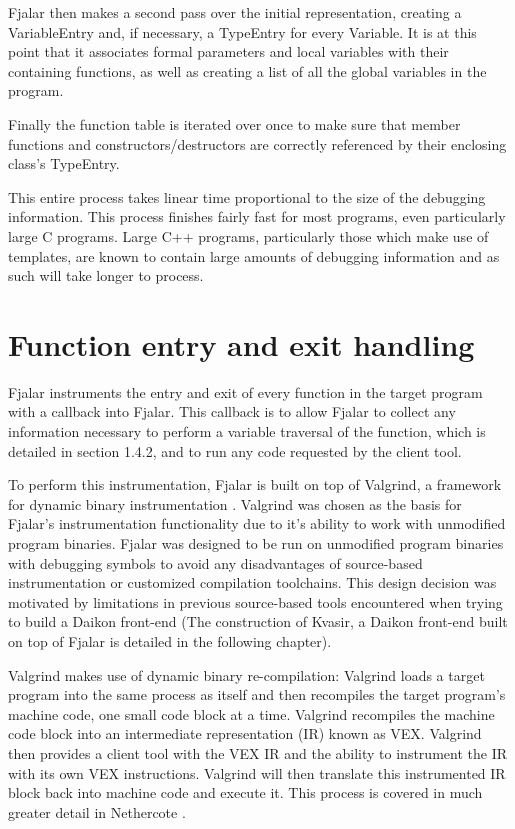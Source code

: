 \documentclass[11pt]{article}
\begin{document}
Fjalar then makes a second pass over the initial representation,
creating a VariableEntry and, if necessary, a TypeEntry for every
Variable. It is at this point that it associates formal parameters and
local variables with their containing functions, as well as creating a
list of all the global variables in the program.

Finally the function table is iterated over once to make sure that
member functions and constructors/destructors are correctly referenced
by their enclosing class's TypeEntry.

This entire process takes linear time proportional to the size of the
debugging information. This process finishes fairly fast for most
programs, even particularly large C programs. Large C++ programs,
particularly those which make use of templates, are known to contain
large amounts of debugging information \cite{rotithor1999measurement}
and as such will take longer to process.

\section{Function entry and exit handling}
Fjalar instruments the entry and exit of every function in the target
program with a callback into Fjalar. This callback is to allow Fjalar
to collect any information necessary to perform a variable traversal
of the function, which is detailed in section 1.4.2, and to run any
code requested by the client tool.

To perform this instrumentation, Fjalar is built on top of Valgrind, a
framework for dynamic binary instrumentation
\cite{nethercote2007valgrind}. Valgrind was chosen as the basis for
Fjalar's instrumentation functionality due to it's ability to work
with unmodified program binaries. Fjalar was designed to be run
on unmodified program binaries with debugging symbols to avoid any
disadvantages of source-based instrumentation or customized
compilation toolchains. This design decision was motivated by
limitations in previous source-based tools encountered when trying to
build a Daikon front-end \cite{Guo2006} (The construction of Kvasir, 
a Daikon front-end built on top of Fjalar is detailed in the following 
chapter).

Valgrind makes use of dynamic binary re-compilation: Valgrind loads a
target program into the same process as itself and then recompiles the
target program's machine code, one small code block at a
time. Valgrind recompiles the machine code block into an intermediate
representation (IR) known as VEX. Valgrind then provides a client tool
with the VEX IR and the ability to instrument the IR with its own VEX
instructions. Valgrind will then translate this instrumented IR block
back into machine code and execute it. This process is covered in much
greater detail in Nethercote \cite{nethercote2007valgrind}.
\end{document}
